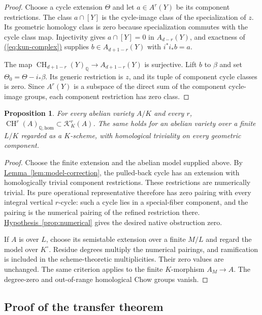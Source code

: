 \documentclass[11pt,a4paper]{article}
\newtheorem{proposition}[theorem]{Proposition}
\theoremstyle{definition}
\theoremstyle{remark}\newtheorem{remark}[theorem]{Remark}
\numberwithin{equation}{section}
\newcommand{\Q}{\mathbb Q}\newcommand{\R}{\mathbb R}\newcommand{\C}{\mathbb C}
\newcommand{\CH}{\operatorname{CH}}\newcommand{\an}{\mathrm{an}}
\newcommand{\homol}{\mathrm{hom}}\newcommand{\BC}{\mathrm{BC}}
\newcommand{\lemref}[1]{\hyperref[#1]{\textcolor{resultlink}{Lemma~\ref*{#1}}}}
\newcommand{\hypref}[1]{\hyperref[#1]{\textcolor{resultlink}{Hypothesis~\ref*{#1}}}}
\renewcommand{\eqref}[1]{\hyperref[#1]{\textcolor{equationlink}{(\ref*{#1})}}}
\begin{document}
\begin{proof}
Choose a cycle extension $\Theta$ and let $a\in A^r(Y)$ be its
component restrictions. The class $a\cap[Y]$ is the cycle-image class
of the specialization of $z$. Its geometric homology class is zero
because specialization commutes with the cycle class map. Injectivity
gives $a\cap[Y]=0$ in $A_{d-r}(Y)$, and exactness of
\eqref{eq:kun-complex} supplies $b\in A_{d+1-r}(Y)$ with
$i^*i_*b=a$.

The map $\CH_{d+1-r}(Y)_\Q\to A_{d+1-r}(Y)$ is surjective.
Lift $b$ to $\beta$ and set $\Theta_0=\Theta-i_*\beta$. Its generic
restriction is $z$, and its tuple of component cycle classes is zero.
Since $A^r(Y)$ is a subspace of the direct sum of the component
cycle-image groups, each component restriction has zero class.
\end{proof}

\begin{proposition}\label{prop:abelian-zero}
For every abelian variety $A/K$ and every $r$,
$\CH^r(A)_{\Q,\homol}\subset\mathcal K_K^r(A)$. The same
holds for an abelian variety over a finite $L/K$ regarded as a
$K$-scheme, with homological triviality on every geometric component.
\end{proposition}

\begin{proof}
Choose the finite extension and the abelian model supplied above.
By \lemref{lem:model-correction}, the pulled-back cycle has an
extension with homologically trivial component restrictions. These
restrictions are numerically trivial. Its pure operational
representative therefore has zero pairing with every integral
vertical $r$-cycle: such a cycle lies in a special-fiber component,
and the pairing is the numerical pairing of the refined restriction
there. \hypref{prop:numerical} gives the desired native obstruction
zero.

If $A$ is over $L$, choose its semistable extension over a finite
$M/L$ and regard the model over $K^\circ$. Residue degrees multiply
the numerical pairings, and ramification is included in the
scheme-theoretic multiplicities. Their zero values are unchanged.
The same criterion applies to the finite $K$-morphism $A_M\to A$.
The degree-zero and out-of-range homological Chow groups vanish.
\end{proof}

\subsection{Proof of the transfer theorem}\label{proof:main}
\end{document}
